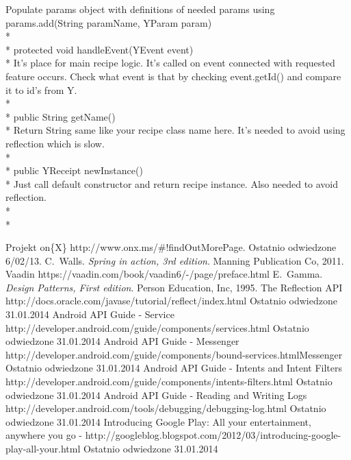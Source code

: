 \documentclass[11pt,a4paper,polish,thesis]{dcsbook}
\begin{document}
Populate params object with definitions of needed params using params.add(String paramName, YParam param)\\*\\*
protected void handleEvent(YEvent event)\\*
It's place for main recipe logic. It's called on event connected with requested feature occurs. Check what event is that by checking event.getId() and compare it to id's from Y.\\*\\*
public String getName()\\*
Return String same like your recipe class name here. It's needed to avoid using reflection which is slow.\\*\\*
public YReceipt newInstance()\\*
Just call default constructor and return recipe instance. Also needed to avoid reflection.\\*\\*



\backmatter

\begin{thebibliography}{1}
Projekt on\{X\} http://www.onx.ms/\#!findOutMorePage. Ostatnio odwiedzone 6/02/13.
C.~Walls. \emph{Spring in action, 3rd edition}. Manning Publication Co, 2011.
Vaadin https://vaadin.com/book/vaadin6/-/page/preface.html 
E.~Gamma. \emph{Design Patterns, First edition}. Person Education, Inc, 1995.
The Reflection API  http://docs.oracle.com/javase/tutorial/reflect/index.html Ostatnio odwiedzone 31.01.2014
 Android API Guide - Service http://developer.android.com/guide/components/services.html Ostatnio odwiedzone 31.01.2014
 Android API Guide - Messenger http://developer.android.com/guide/components/bound-services.htmlMessenger  Ostatnio odwiedzone 31.01.2014 
 Android API Guide - Intents and Intent Filters http://developer.android.com/guide/components/intents-filters.html Ostatnio odwiedzone 31.01.2014 
 Android API Guide - Reading and Writing Logs http://developer.android.com/tools/debugging/debugging-log.html Ostatnio odwiedzone 31.01.2014
Introducing Google Play: All your entertainment, anywhere you go - http://googleblog.blogspot.com/2012/03/introducing-google-play-all-your.html Ostatnio odwiedzone 31.01.2014
\end{thebibliography}
\end{document}
